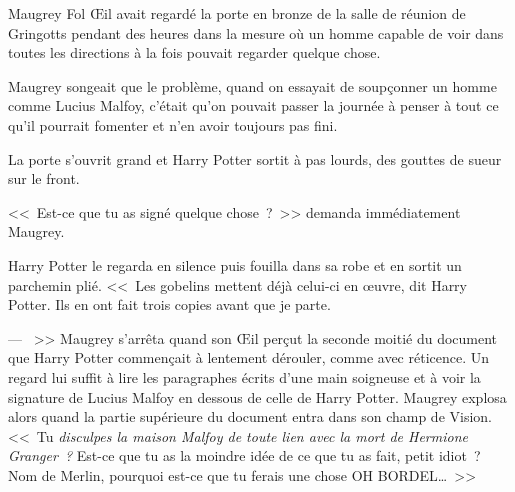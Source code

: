 \later

Maugrey Fol Œil avait regardé la porte en bronze de la salle de réunion de Gringotts pendant des heures dans la mesure où un homme capable de voir dans toutes les directions à la fois pouvait regarder quelque chose.

Maugrey songeait que le problème, quand on essayait de soupçonner un homme comme Lucius Malfoy, c'était qu'on pouvait passer la journée à penser à tout ce qu'il pourrait fomenter et n'en avoir toujours pas fini.

La porte s'ouvrit grand et Harry Potter sortit à pas lourds, des gouttes de sueur sur le front.

<<~Est-ce que tu as signé quelque chose~?~>> demanda immédiatement Maugrey.

Harry Potter le regarda en silence puis fouilla dans sa robe et en sortit un parchemin plié. <<~Les gobelins mettent déjà celui-ci en œuvre, dit Harry Potter. Ils en ont fait trois copies avant que je parte.

--- ~>> Maugrey s'arrêta quand son Œil perçut la seconde moitié du document que Harry Potter commençait à lentement dérouler, comme avec réticence. Un regard lui suffit à lire les paragraphes écrits d'une main soigneuse et à voir la signature de Lucius Malfoy en dessous de celle de Harry Potter. Maugrey explosa alors quand la partie supérieure du document entra dans son champ de Vision. <<~Tu \emph{disculpes la maison Malfoy de toute lien avec la mort de Hermione Granger~?} Est-ce que tu as la moindre idée de ce que tu as fait, petit idiot~? Nom de Merlin, pourquoi est-ce que tu ferais une chose OH BORDEL…~>>
